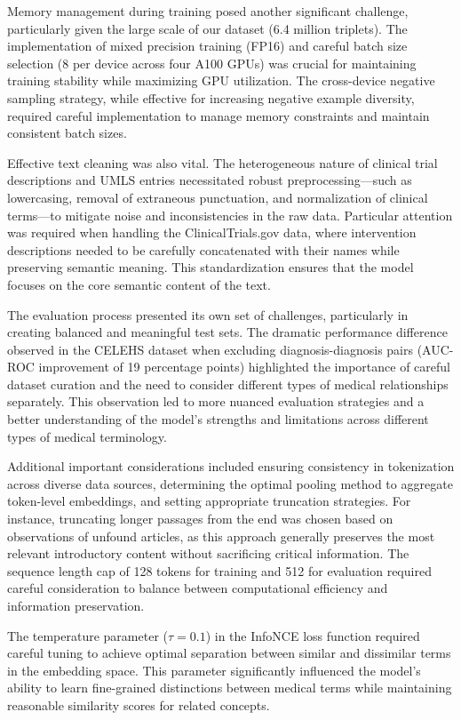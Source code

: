 Memory management during training posed another significant challenge, particularly given the large scale of our dataset (6.4 million triplets). The implementation of mixed precision training (FP16) and careful batch size selection (8 per device across four A100 GPUs) was crucial for maintaining training stability while maximizing GPU utilization. The cross-device negative sampling strategy, while effective for increasing negative example diversity, required careful implementation to manage memory constraints and maintain consistent batch sizes.

Effective text cleaning was also vital. The heterogeneous nature of clinical trial descriptions and UMLS entries necessitated robust preprocessing—such as lowercasing, removal of extraneous punctuation, and normalization of clinical terms—to mitigate noise and inconsistencies in the raw data. Particular attention was required when handling the ClinicalTrials.gov data, where intervention descriptions needed to be carefully concatenated with their names while preserving semantic meaning. This standardization ensures that the model focuses on the core semantic content of the text.

The evaluation process presented its own set of challenges, particularly in creating balanced and meaningful test sets. The dramatic performance difference observed in the CELEHS dataset when excluding diagnosis-diagnosis pairs (AUC-ROC improvement of 19 percentage points) highlighted the importance of careful dataset curation and the need to consider different types of medical relationships separately. This observation led to more nuanced evaluation strategies and a better understanding of the model's strengths and limitations across different types of medical terminology.

Additional important considerations included ensuring consistency in tokenization across diverse data sources, determining the optimal pooling method to aggregate token-level embeddings, and setting appropriate truncation strategies. For instance, truncating longer passages from the end was chosen based on observations of unfound articles, as this approach generally preserves the most relevant introductory content without sacrificing critical information. The sequence length cap of 128 tokens for training and 512 for evaluation required careful consideration to balance between computational efficiency and information preservation.

The temperature parameter ($\tau = 0.1$) in the InfoNCE loss function required careful tuning to achieve optimal separation between similar and dissimilar terms in the embedding space. This parameter significantly influenced the model's ability to learn fine-grained distinctions between medical terms while maintaining reasonable similarity scores for related concepts.

